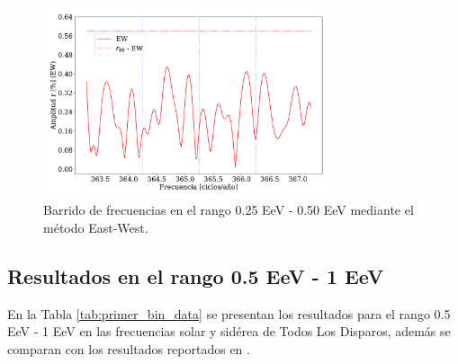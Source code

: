 \begin{figure}[H]
    \begin{small}
        \begin{center}
            \includegraphics[width=0.75\textwidth]{plot_bin_1_barrido_v3_EW.pdf}
        \end{center}
        \caption{Barrido de frecuencias en el  rango 0.25 EeV - 0.50 EeV mediante el método East-West.}
        \label{fig:primer_barrido}
    \end{small}
\end{figure}

\subsection{Resultados en el rango 0.5 EeV - 1 EeV}
En la Tabla \ref{tab:primer_bin_data} se presentan los resultados para el rango 0.5 EeV - 1 EeV en las frecuencias solar y sidérea de Todos Los Disparos, además se comparan con los resultados reportados en \cite{Aab_2020}.


